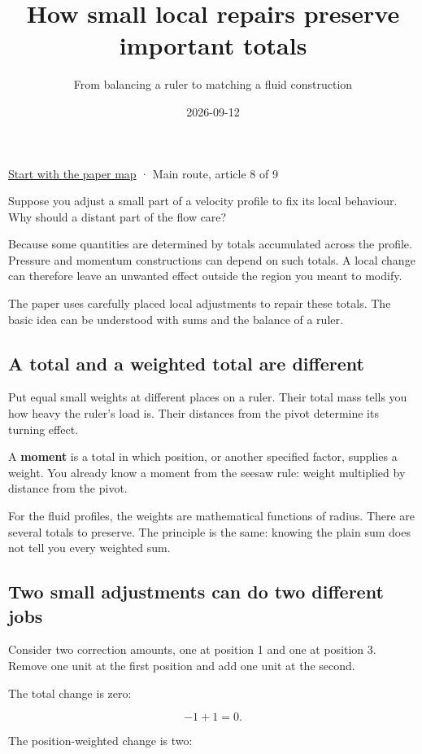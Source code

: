\documentclass[
  english,
  11pt,
]{article}
\title{How small local repairs preserve important totals}
\subtitle{From balancing a ruler to matching a fluid construction}
\author{}
\date{2026-09-12}
\begin{document}
\maketitle


\href{../paper-map/article.html}{Start with the paper map} · Main route,
article 8 of 9

Suppose you adjust a small part of a velocity profile to fix its local
behaviour. Why should a distant part of the flow care?

Because some quantities are determined by totals accumulated across the
profile. Pressure and momentum constructions can depend on such totals.
A local change can therefore leave an unwanted effect outside the region
you meant to modify.

The paper uses carefully placed local adjustments to repair these
totals. The basic idea can be understood with sums and the balance of a
ruler.

\subsection{A total and a weighted total are
different}\label{a-total-and-a-weighted-total-are-different}

Put equal small weights at different places on a ruler. Their total mass
tells you how heavy the ruler's load is. Their distances from the pivot
determine its turning effect.

A \textbf{moment} is a total in which position, or another specified
factor, supplies a weight. You already know a moment from the seesaw
rule: weight multiplied by distance from the pivot.

For the fluid profiles, the weights are mathematical functions of
radius. There are several totals to preserve. The principle is the same:
knowing the plain sum does not tell you every weighted sum.

\subsection{Two small adjustments can do two different
jobs}\label{two-small-adjustments-can-do-two-different-jobs}

Consider two correction amounts, one at position 1 and one at position
3. Remove one unit at the first position and add one unit at the second.

The total change is zero:

\[
-1+1=0.
\]

The position-weighted change is two:
\end{document}
